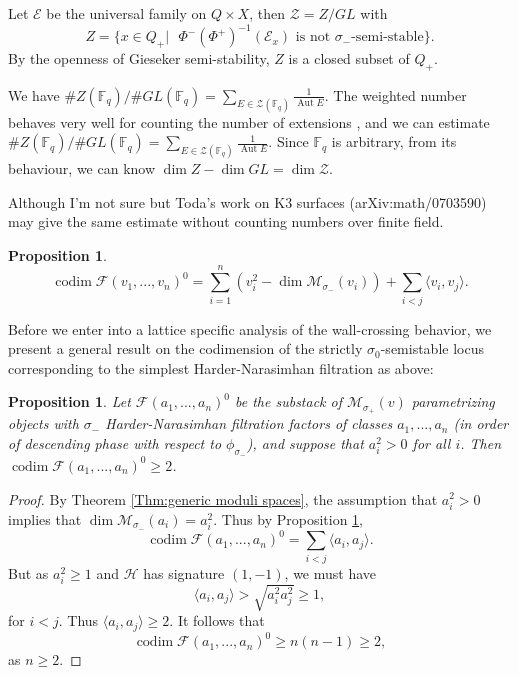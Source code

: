 \documentclass[leqno,11pt]{amsart}
\def\Aut{\mathop{\mathrm{Aut}}\nolimits}
\def\codim{\mathop{\mathrm{codim}}\nolimits}
\def\dim{\mathop{\mathrm{dim}}\nolimits}
\newtheorem{Prop}[Thm]{Proposition}
\theoremstyle{definition}
\def\FF{\ensuremath{\mathcal F}}
\def\HH{\ensuremath{\mathcal H}}
\def\MM{\ensuremath{\mathcal M}}
\def\cal{\mathcal}
\def\Bbb{\mathbb}
\begin{document}
Let ${\cal E}$ be the universal family on $Q \times X$, then
${\cal Z}=Z/GL$ with
$$
Z=\{x \in Q_+ | \text{ $\Phi^- (\Phi^+)^{-1}({\cal E}_x)$ is not $\sigma_-$-semi-stable} \}.
$$
By the openness of Gieseker semi-stability, $Z$ is a closed subset of $Q_+$.

We have 
$\# Z({\Bbb F}_q)/\# GL({\Bbb F}_q)=\sum_{E \in {\cal Z}({\Bbb F}_q)} \frac{1}{\Aut E}$.
The weighted number behaves very well for counting the number of extensions \cite{DR75}, and
we  can estimate $\# Z({\Bbb F}_q)/\# GL({\Bbb F}_q)=\sum_{E \in {\cal Z}({\Bbb F}_q)} \frac{1}{\Aut E}$.
Since ${\Bbb F}_q$ is arbitrary, from its behaviour, we can know
$\dim Z-\dim GL=\dim {\cal Z}$. 

Although I'm not sure but Toda's work on K3 surfaces  (arXiv:math/0703590)
may give the same estimate without counting numbers over finite field.

\begin{Prop}\label{Prop:HN codim}
$$\codim\FF(v_1,...,v_n)^0=\sum_{i=1}^n (v_i^2-\dim\MM_{\sigma_-}(v_i))+\sum_{i<j}\langle v_i,v_j\rangle.$$

\end{Prop}

Before we enter into a lattice specific analysis of the wall-crossing behavior, we present a general result on the codimension of the strictly $\sigma_0$-semistable locus corresponding to the simplest Harder-Narasimhan filtration as above:
\begin{Prop}\label{Prop:HN filtration all positive classes}
Let $\FF(a_1,...,a_n)^0$ be the substack of $\MM_{\sigma_+}(v)$ parametrizing objects with $\sigma_-$ Harder-Narasimhan filtration factors of classes $a_1,...,a_n$ (in order of descending phase with respect to $\phi_{\sigma_-}$), and suppose that $a_i^2>0$ for all $i$.  Then $\codim\FF(a_1,...,a_n)^0\geq 2$.  
\end{Prop}
\begin{proof}
By Theorem \ref{Thm:generic moduli spaces}, the assumption that $a_i^2>0$ implies that $\dim\MM_{\sigma_-}(a_i)=a_i^2$.  Thus by Proposition \ref{Prop:HN codim}, $$\codim\FF(a_1,...,a_n)^0=\sum_{i<j}\langle a_i,a_j\rangle.$$  But as $a_i^2\geq 1$ and $\HH$ has signature $(1,-1)$, we must have $$\langle a_i,a_j\rangle>\sqrt{a_i^2 a_j^2}\geq 1,$$ for $i<j$.  Thus $\langle a_i,a_j\rangle\geq 2$.  It follows that $$\codim\FF(a_1,...,a_n)^0\geq n(n-1)\geq 2,$$ as $n\geq 2$.
\end{proof}
\end{document}
